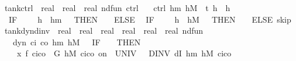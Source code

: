 \documentclass[envcountsame,envcountsect]{llncs}
\begin{document}
\begin{example}
\begin{isabellebody}
\isanewline
{}\isamarkupfalse%
\ tank{\isacharunderscore}ctrl\ {\isacharcolon}{\isacharcolon}\ {\isachardoublequoteopen}real\ {\isasymRightarrow}\ real\ {\isasymRightarrow}\ {\isacharparenleft}real{\isacharcircum}{}{\isacharparenright}\ nd{\isacharunderscore}fun{\isachardoublequoteclose}\ {\isacharparenleft}{\isachardoublequoteopen}ctrl{\isachardoublequoteclose}{\isacharparenright}\isanewline
\ \ \ {\isachardoublequoteopen}ctrl\ h\isactrlsub m\ h\isactrlsub M\ {\isasymequiv}\ {\isacharparenleft}t\ {\isacharcolon}{\isacharcolon}{\isacharequal}{}{\isacharparenright}{\isacharsemicolon}{\isacharparenleft}h\ {\isacharcolon}{\isacharcolon}{\isacharequal}\ h{\isacharparenright}{\isacharsemicolon}\isanewline
\ \ {\isacharparenleft}IF\ {\isacharparenleft}{\isasympi}\ {\isacharequal}\ {}\ {\isasymand}\ h\ {\isasymle}\ h\isactrlsub m\ {\isacharplus}\ {}{\isacharparenright}\ THEN\ {\isacharparenleft}{\isasympi}\ {\isacharcolon}{\isacharcolon}{\isacharequal}\ {}{\isacharparenright}\ ELSE\isanewline
\ \ {\isacharparenleft}IF\ {\isacharparenleft}{\isasympi}\ {\isacharequal}\ {}\ {\isasymand}\ h\ {\isasymge}\ h\isactrlsub M\ {\isacharminus}\ {}{\isacharparenright}\ THEN\ {\isacharparenleft}{\isasympi}\ {\isacharcolon}{\isacharcolon}{\isacharequal}\ {}{\isacharparenright}\ ELSE\ skip{\isacharparenright}{\isacharparenright}{\isachardoublequoteclose}\isanewline
\isanewline
{}\isamarkupfalse%
\ tank{\isacharunderscore}dyn{\isacharunderscore}dinv\ {\isacharcolon}{\isacharcolon}\ {\isachardoublequoteopen}real\ {\isasymRightarrow}\ real\ {\isasymRightarrow}\ real\ {\isasymRightarrow}\ real\ {\isasymRightarrow}\ real\ {\isasymRightarrow}\ {\isacharparenleft}real{\isacharcircum}{}{\isacharparenright}\ nd{\isacharunderscore}fun{\isachardoublequoteclose}\isanewline
\ \ \ {\isachardoublequoteopen}dyn\ c\isactrlsub i\ c\isactrlsub o\ h\isactrlsub m\ h\isactrlsub M\ {\isasymtau}\ {\isasymequiv}\ {\isacharparenleft}IF\ {\isacharparenleft}{\isasympi}\ {\isacharequal}\ {}{\isacharparenright}\ THEN\ \isanewline
\ \ \ \ {\isacharparenleft}x{\isasymacute}{\isacharequal}\ f\ {\isacharparenleft}c\isactrlsub i{\isacharminus}c\isactrlsub o{\isacharparenright}\ {\isacharampersand}\ G\ h\isactrlsub M\ {\isacharparenleft}c\isactrlsub i{\isacharminus}c\isactrlsub o{\isacharparenright}\ on\ {\isacharbraceleft}{}{\isachardot}{\isachardot}{\isasymtau}{\isacharbraceright}\ UNIV\ {\isacharat}\ {}\ DINV\ {\isacharparenleft}dI\ h\isactrlsub m\ h\isactrlsub M\ {\isacharparenleft}c\isactrlsub i{\isacharminus}c\isactrlsub o{\isacharparenright}{\isacharparenright}{\isacharparenright}\isanewline

\end{isabellebody}
\end{example}
\end{document}
